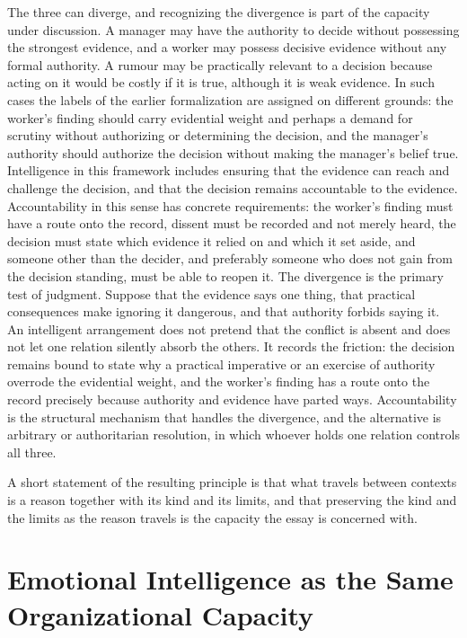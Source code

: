 \documentclass[12pt, a4paper]{article}
\begin{document}
The three can diverge, and recognizing the divergence is part of the capacity under discussion. A manager may have the authority to decide without possessing the strongest evidence, and a worker may possess decisive evidence without any formal authority. A rumour may be practically relevant to a decision because acting on it would be costly if it is true, although it is weak evidence. In such cases the labels of the earlier formalization are assigned on different grounds: the worker's finding should carry evidential weight and perhaps a demand for scrutiny without authorizing or determining the decision, and the manager's authority should authorize the decision without making the manager's belief true. Intelligence in this framework includes ensuring that the evidence can reach and challenge the decision, and that the decision remains accountable to the evidence. Accountability in this sense has concrete requirements: the worker's finding must have a route onto the record, dissent must be recorded and not merely heard, the decision must state which evidence it relied on and which it set aside, and someone other than the decider, and preferably someone who does not gain from the decision standing, must be able to reopen it. The divergence is the primary test of judgment. Suppose that the evidence says one thing, that practical consequences make ignoring it dangerous, and that authority forbids saying it. An intelligent arrangement does not pretend that the conflict is absent and does not let one relation silently absorb the others. It records the friction: the decision remains bound to state why a practical imperative or an exercise of authority overrode the evidential weight, and the worker's finding has a route onto the record precisely because authority and evidence have parted ways. Accountability is the structural mechanism that handles the divergence, and the alternative is arbitrary or authoritarian resolution, in which whoever holds one relation controls all three.

A short statement of the resulting principle is that what travels between contexts is a reason together with its kind and its limits, and that preserving the kind and the limits as the reason travels is the capacity the essay is concerned with.

\section{Emotional Intelligence as the Same Organizational Capacity}
\end{document}
